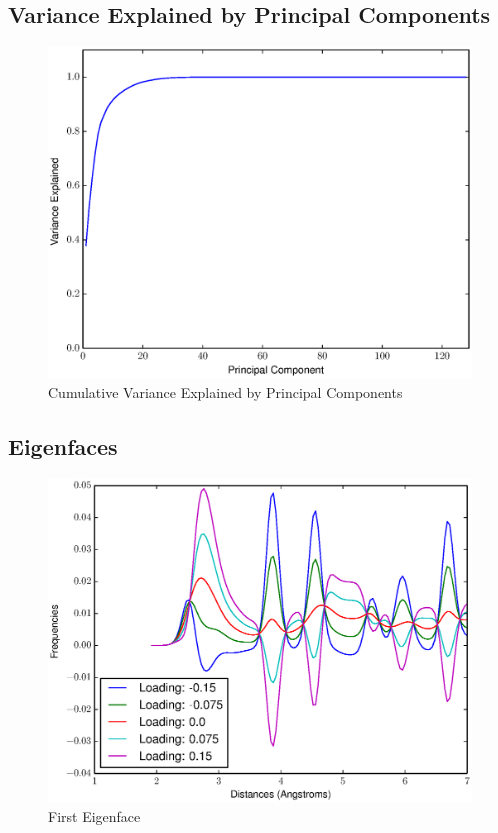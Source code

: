 \documentclass[12pt,letterpaper]{article}
\begin{document}
\subsection{Variance Explained by Principal Components}
\begin{figure}[ht]
  \begin{center}
    \includegraphics[scale=0.8]{figs/eigenfaces_varexplained.eps}
    \caption{Cumulative Variance Explained by Principal Components}
  \end{center}
\end{figure}
\clearpage

\subsection{Eigenfaces}
\begin{figure}[ht]
  \begin{center}
    \includegraphics[scale=0.8]{figs/eigenface1.eps}
    \caption{First Eigenface}
  \end{center}
\end{figure}
\end{document}

